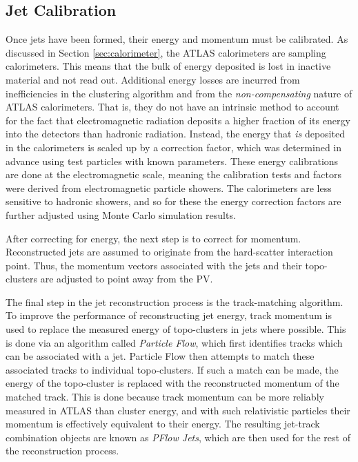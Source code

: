         \FloatBarrier
        \subsection{Jet Calibration}

        Once jets have been formed, their energy and momentum must be calibrated.
        As discussed in Section \ref{sec:calorimeter}, the ATLAS calorimeters are sampling calorimeters.
        This means that the bulk of energy deposited is lost in inactive material and not read out.
        Additional energy losses are incurred from inefficiencies in the clustering algorithm and from the \textit{non-compensating} nature of ATLAS calorimeters.
        That is, they do not have an intrinsic method to account for the fact that electromagnetic radiation deposits a higher fraction of its energy into the detectors than hadronic radiation\cite{cell_clustering}.
        Instead, the energy that \textit{is} deposited in the calorimeters is scaled up by a correction factor,
            which was determined in advance using test particles with known parameters\cite{jet_energy_measurment}.
        These energy calibrations are done at the electromagnetic scale,
            meaning the calibration tests and factors were derived from electromagnetic particle showers.
        The calorimeters are less sensitive to hadronic showers,
            and so for these the energy correction factors are further adjusted using Monte Carlo simulation results.

        After correcting for energy, the next step is to correct for momentum.
        Reconstructed jets are assumed to originate from the hard-scatter interaction point.
        Thus, the momentum vectors associated with the jets and their topo-clusters are adjusted to point away from the PV.

        The final step in the jet reconstruction process is the track-matching algorithm.
        To improve the performance of reconstructing jet energy,
            track momentum is used to replace the measured energy of topo-clusters in jets where possible.
        This is done via an algorithm called \textit{Particle Flow},
            which first identifies tracks which can be associated with a jet.
        Particle Flow then attempts to match these associated tracks to individual topo-clusters.
        If such a match can be made, the energy of the topo-cluster is replaced with the reconstructed momentum of the matched track.
        This is done because track momentum can be more reliably measured in ATLAS than cluster energy,
            and with such relativistic particles their momentum is effectively equivalent to their energy.
        The resulting jet-track combination objects are known as \textit{PFlow Jets},
            which are then used for the rest of the reconstruction process\cite{pflow}.


